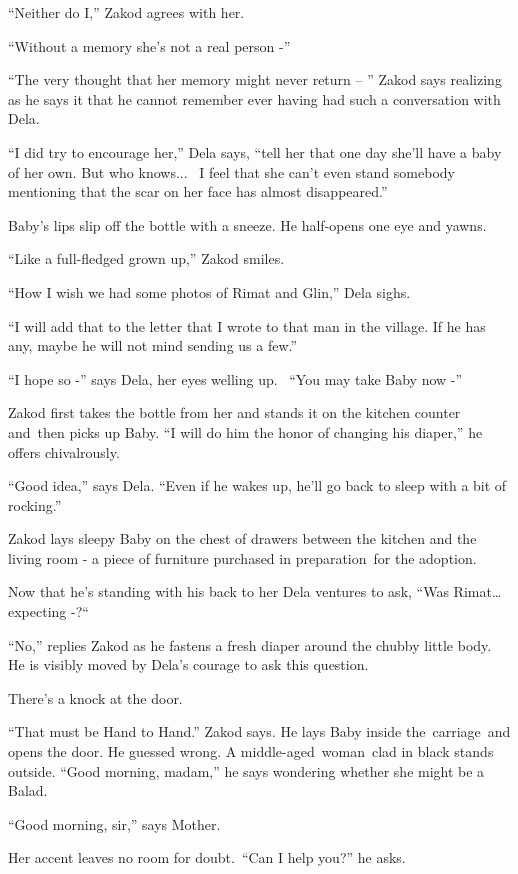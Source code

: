 \documentclass[twoside,11pt]{book}
\begin{document}
``Neither do I,'' Zakod agrees with her.

``Without a memory she's not a real person -'' 

``The very thought that her memory might never return -- '' Zakod says realizing as he says it
that he cannot remember ever having had such a conversation with Dela. 

``I did try to encourage her,'' Dela says, ``tell her that one day she'll have a
baby of her own. But who knows...~ I feel that she can't even stand somebody mentioning that the scar on her face has
almost disappeared.''

Baby's lips slip off the bottle with a sneeze. He half-opens one eye and yawns. 

``Like a full-fledged grown up,'' Zakod smiles. 

``How I wish we had some photos of Rimat and Glin,'' Dela sighs.

``I will add that to the letter that I wrote to that man in the village. If he has any, maybe he will not
mind sending us a few.'' 

``I hope so -'' says Dela, her eyes welling up. ~``You may take Baby now
-'' 

Zakod first takes the bottle from her and stands it on the kitchen counter and\ then picks up Baby. ``I
will do him the honor of changing his diaper,'' he offers chivalrously.~

``Good idea,'' says Dela. ``Even if he wakes up, he'll go back to sleep with a
bit of rocking.'' 

Zakod lays sleepy Baby on the chest of drawers between the kitchen and the living room - a piece of furniture purchased
in preparation~for the adoption.

Now that he's standing with his back to her Dela ventures to ask, ``Was Rimat{\dots} expecting
-?``\ 

``No,'' replies Zakod as he fastens a fresh diaper around the chubby little body.~ He is
visibly moved by Dela's courage to ask this question.

There's a knock at the door. 

{}``That must be Hand to Hand.'' Zakod says. He lays Baby inside the\ carriage\  and opens the door. He
guessed wrong. A middle-aged{\ }woman\  clad in black stands outside. ``Good morning,
madam,'' he says wondering whether she might be a Balad.

``Good morning, sir,'' says Mother. 

Her accent leaves no room for doubt.\ ``Can I help you?'' he asks.
\end{document}
